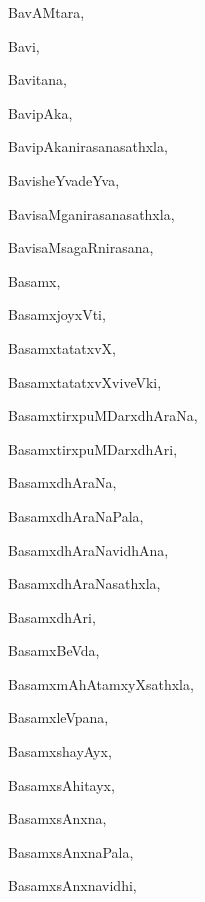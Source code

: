 \begin{multicols}{3}
{\noindent
{BavAMtara}, \pageref{BavAMtara}

\noindent
{Bavi}, \pageref{Bavi}

\noindent
{Bavitana}, \pageref{Bavitana}

\noindent
{BavipAka}, \pageref{BavipAka}

\noindent
{BavipAkanirasanasathxla}, \pageref{BavipAkanirasanasathxla}

\noindent
{BavisheYvadeYva}, \pageref{BavisheYvadeYva}

\noindent
{BavisaMganirasanasathxla}, \pageref{BavisaMganirasanasathxla}

\noindent
{BavisaMsagaRnirasana}, \pageref{BavisaMsagaRnirasana}

\noindent
{Basamx}, \pageref{Basamx}

\noindent
{BasamxjoyxVti}, \pageref{BasamxjoyxVti}

\noindent
{BasamxtatatxvX}, \pageref{BasamxtatatxvX}

\noindent
{BasamxtatatxvXviveVki}, \pageref{BasamxtatatxvXviveVki}

\noindent
{BasamxtirxpuMDarxdhAraNa}, \pageref{BasamxtirxpuMDarxdhAraNa}

\noindent
{BasamxtirxpuMDarxdhAri}, \pageref{BasamxtirxpuMDarxdhAri}

\noindent
{BasamxdhAraNa}, \pageref{BasamxdhAraNa}

\noindent
{BasamxdhAraNaPala}, \pageref{BasamxdhAraNaPala}

\noindent
{BasamxdhAraNavidhAna}, \pageref{BasamxdhAraNavidhAna}

\noindent
{BasamxdhAraNasathxla}, \pageref{BasamxdhAraNasathxla}

\noindent
{BasamxdhAri}, \pageref{BasamxdhAri}

\noindent
{BasamxBeVda}, \pageref{BasamxBeVda}

\noindent
{BasamxmAhAtamxyXsathxla}, \pageref{BasamxmAhAtamxyXsathxla}

\noindent
{BasamxleVpana}, \pageref{BasamxleVpana}

\noindent
{BasamxshayAyx}, \pageref{BasamxshayAyx}

\noindent
{BasamxsAhitayx}, \pageref{BasamxsAhitayx}

\noindent
{BasamxsAnxna}, \pageref{BasamxsAnxna}

\noindent
{BasamxsAnxnaPala}, \pageref{BasamxsAnxnaPala}

\noindent
{BasamxsAnxnavidhi}, \pageref{BasamxsAnxnavidhi}

}
\end{multicols}
